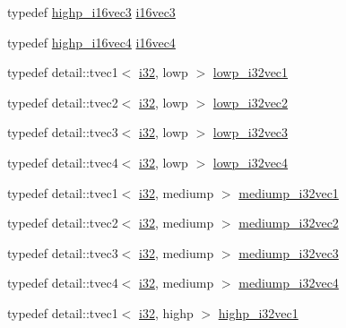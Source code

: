 \begin{CompactItemize}
\item 
typedef \hyperlink{group__gtc__type__precision_g8dcfd412bd9ce99a1cf5c2b6e50f07e7}{highp\_\-i16vec3} \hyperlink{group__gtc__type__precision_g22ec113d49837ef823048bb01511564c}{i16vec3}
\item 
typedef \hyperlink{group__gtc__type__precision_g7fd6f1b3c224833cc330a2c64b6994dd}{highp\_\-i16vec4} \hyperlink{group__gtc__type__precision_g28cd96ac55e2209bdbd3a41cb8af970a}{i16vec4}
\item 
typedef detail::tvec1$<$ \hyperlink{group__gtc__type__precision_g1d8ed5c43e91ea7d4528389da4fa9524}{i32}, lowp $>$ \hyperlink{group__gtc__type__precision_gdb82f1c8a0f4d3304862d32079961974}{lowp\_\-i32vec1}
\item 
typedef detail::tvec2$<$ \hyperlink{group__gtc__type__precision_g1d8ed5c43e91ea7d4528389da4fa9524}{i32}, lowp $>$ \hyperlink{group__gtc__type__precision_g1ac855a9b4ef24908d00ab715e7ddbff}{lowp\_\-i32vec2}
\item 
typedef detail::tvec3$<$ \hyperlink{group__gtc__type__precision_g1d8ed5c43e91ea7d4528389da4fa9524}{i32}, lowp $>$ \hyperlink{group__gtc__type__precision_ga4a0dd64d4253a3641225254670c7b95}{lowp\_\-i32vec3}
\item 
typedef detail::tvec4$<$ \hyperlink{group__gtc__type__precision_g1d8ed5c43e91ea7d4528389da4fa9524}{i32}, lowp $>$ \hyperlink{group__gtc__type__precision_g99adefeda08a56345b0553d13283d2fa}{lowp\_\-i32vec4}
\item 
typedef detail::tvec1$<$ \hyperlink{group__gtc__type__precision_g1d8ed5c43e91ea7d4528389da4fa9524}{i32}, mediump $>$ \hyperlink{group__gtc__type__precision_g44c6a3b78e635d91e35e1c41ab6b0ba1}{mediump\_\-i32vec1}
\item 
typedef detail::tvec2$<$ \hyperlink{group__gtc__type__precision_g1d8ed5c43e91ea7d4528389da4fa9524}{i32}, mediump $>$ \hyperlink{group__gtc__type__precision_gef7b37956ce9e1cc4faecf21b7fdae8b}{mediump\_\-i32vec2}
\item 
typedef detail::tvec3$<$ \hyperlink{group__gtc__type__precision_g1d8ed5c43e91ea7d4528389da4fa9524}{i32}, mediump $>$ \hyperlink{group__gtc__type__precision_g768e62b66086bd85a438341eedfad651}{mediump\_\-i32vec3}
\item 
typedef detail::tvec4$<$ \hyperlink{group__gtc__type__precision_g1d8ed5c43e91ea7d4528389da4fa9524}{i32}, mediump $>$ \hyperlink{group__gtc__type__precision_g68126328090f37655d8218c5a5fb8ae5}{mediump\_\-i32vec4}
\item 
typedef detail::tvec1$<$ \hyperlink{group__gtc__type__precision_g1d8ed5c43e91ea7d4528389da4fa9524}{i32}, highp $>$ \hyperlink{group__gtc__type__precision_gdcd58130a48fa561e784a135a88c5d6e}{highp\_\-i32vec1}

\end{CompactItemize}
